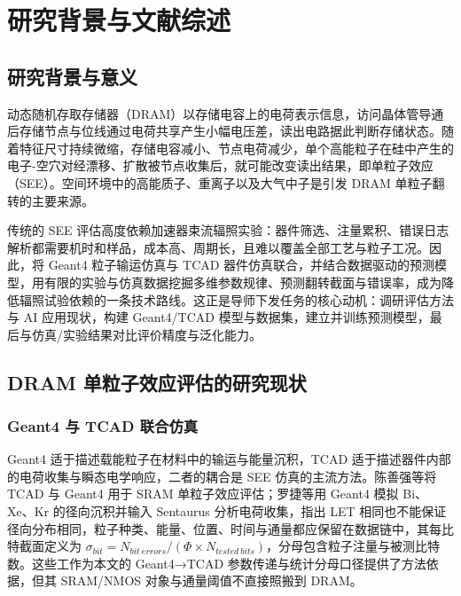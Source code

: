 \section{研究背景与文献综述}

\subsection{研究背景与意义}

动态随机存取存储器（DRAM）以存储电容上的电荷表示信息，访问晶体管导通后存储节点与位线通过电荷共享产生小幅电压差，读出电路据此判断存储状态\cite{keeth2001}。随着特征尺寸持续微缩，存储电容减小、节点电荷减少，单个高能粒子在硅中产生的电子-空穴对经漂移、扩散被节点收集后，就可能改变读出结果，即单粒子效应（SEE）\cite{label1996,baumann2005}。空间环境中的高能质子、重离子以及大气中子是引发 DRAM 单粒子翻转的主要来源。

传统的 SEE 评估高度依赖加速器束流辐照实验：器件筛选、注量累积、错误日志解析都需要机时和样品，成本高、周期长，且难以覆盖全部工艺与粒子工况。因此，将 Geant4 粒子输运仿真与 TCAD 器件仿真联合，并结合数据驱动的预测模型，用有限的实验与仿真数据挖掘多维参数规律、预测翻转截面与错误率，成为降低辐照试验依赖的一条技术路线。这正是导师下发任务的核心动机：调研评估方法与 AI 应用现状，构建 Geant4/TCAD 模型与数据集，建立并训练预测模型，最后与仿真/实验结果对比评价精度与泛化能力\cite{mentortask}。

\subsection{DRAM 单粒子效应评估的研究现状}

\subsubsection{Geant4 与 TCAD 联合仿真}
Geant4 适于描述载能粒子在材料中的输运与能量沉积，TCAD 适于描述器件内部的电荷收集与瞬态电学响应，二者的耦合是 SEE 仿真的主流方法。陈善强等将 TCAD 与 Geant4 用于 SRAM 单粒子效应评估\cite{chen2011}；罗捷等用 Geant4 模拟 Bi、Xe、Kr 的径向沉积并输入 Sentaurus 分析电荷收集，指出 LET 相同也不能保证径向分布相同，粒子种类、能量、位置、时间与通量都应保留在数据链中，其每比特截面定义为 $\sigma_{bit}=N_{bit\ errors}/(\Phi \times N_{tested\ bits})$，分母包含粒子注量与被测比特数\cite{luo2018}。这些工作为本文的 Geant4→TCAD 参数传递与统计分母口径提供了方法依据，但其 SRAM/NMOS 对象与通量阈值不直接照搬到 DRAM。

